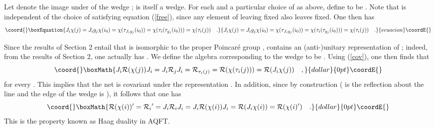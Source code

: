 \documentclass[a4paper,twoside,12pt]{article}
\def\Js{{\cal J}}
\def\Ps{{\cal P}}
\def\Rs{{\cal R}}
\begin{document}
     Let \coordHE{} denote the 
image under \myHighlight{$g \in \Js$}\coordHE{} of the wedge \coordHE{}; \coordHE{} is itself 
a wedge. For each \coordHE{} and a particular choice of \coordHE{} as above, define 
\coordHE{} to be \coordHE{}. Note that
\coordHE{} is independent of the choice of \myHighlight{$g_i \in \Js$}\coordHE{} satisfying
equation (\ref{free}), since any element of \myHighlight{$\Ps_+$}\coordHE{} leaving \coordHE{}
fixed also leaves \coordHE{} fixed. 
One then has
%
\begin{equation}\coord{}\boxEquation{
J_i \chi(j) = J_i g_j \chi(i_0) = \chi(\tau_{J_i g_j}(i_0)) =
\chi(\tau_i(\tau_{g_j}(i_0))) = \chi(\tau_i(j)) \quad . \label{cov}
}{
J_i \chi(j) = J_i g_j \chi(i_0) = \chi(\tau_{J_i g_j}(i_0)) =
\chi(\tau_i(\tau_{g_j}(i_0))) = \chi(\tau_i(j)) \quad . }{ecuacion}\coordE{}\end{equation}
%

     Since the results of Section 2 entail that \myHighlight{$\Js$}\coordHE{} is isomorphic to
the proper Poincar\'e group \myHighlight{$\Ps_+$}\coordHE{}, \myHighlight{$\Js$}\coordHE{} contains an (anti-)unitary
representation \myHighlight{$U(\Ps_+)$}\coordHE{} of \myHighlight{$\Ps_+$}\coordHE{}; indeed, from the results of
Section 2, one actually has \myHighlight{$\Js = U(\Ps_+)$}\coordHE{}. We define the algebra
\myHighlight{$\Rs(\chi(i))$}\coordHE{} corresponding to the wedge \coordHE{} to be \myHighlight{$\Rs_i$}\coordHE{}. 
Using (\ref{cov}), one then finds that
%
$$\coord{}\boxMath{J_i \Rs(\chi(j)) J_i = J_i \Rs_j J_i = \Rs_{\tau_i(j)} = \Rs(\chi(\tau_i(j)))
= \Rs(J_i \chi(j)) \quad   ,  }{dollar}{0pt}\coordE{}$$
%
for every \coordHE{}. This implies that the net \myHighlight{$\{ \Rs(\chi(i)) \}_{i \in I}$}\coordHE{}
is covariant under the representation \myHighlight{$U(\Ps_+)$}\coordHE{}. In addition,
since by construction \coordHE{} (\coordHE{} is the reflection about
the line \coordHE{} and the edge of the wedge \coordHE{} is 
\coordHE{}), it follows that one has
%
$$\coord{}\boxMath{\Rs(\chi(i))' = \Rs_i{}' = J_i \Rs_i J_i = J_i \Rs(\chi(i)) J_i = 
\Rs(J_i \chi(i)) = \Rs(\chi(i)') \quad .         }{dollar}{0pt}\coordE{}$$
%
This is the property known as Haag duality in AQFT.
\end{document}
